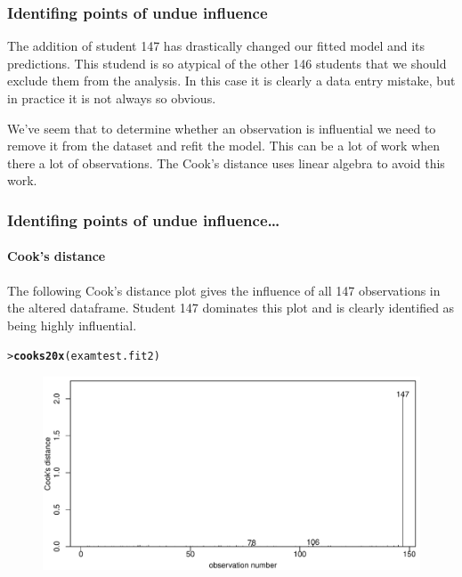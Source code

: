 \documentclass{beamer}\usepackage[]{graphicx}\usepackage[]{xcolor}
\makeatletter
\newcommand{\hlstd}[1]{\textcolor[rgb]{0.345,0.345,0.345}{#1}}%
\newcommand{\hlkwd}[1]{\textcolor[rgb]{0.737,0.353,0.396}{\textbf{#1}}}%
\newenvironment{kframe}{%
 \def\at@end@of@kframe{}%
 \ifinner\ifhmode%
  \def\at@end@of@kframe{\end{minipage}}%
  \begin{minipage}{\columnwidth}%
 \fi\fi%
 \def\FrameCommand##1{\hskip\@totalleftmargin \hskip-\fboxsep
 \colorbox{shadecolor}{##1}\hskip-\fboxsep
     \hskip-\linewidth \hskip-\@totalleftmargin \hskip\columnwidth}%
 \MakeFramed {\advance\hsize-\width
   \@totalleftmargin\z@ \linewidth\hsize
   \@setminipage}}%
 {\par\unskip\endMakeFramed%
 \at@end@of@kframe}
\newenvironment{knitrout}{}{} %
\makeatother
\begin{document}
\begin{frame}[fragile]
\frametitle{Identifing points of undue influence}

The addition of student 147 has drastically changed our fitted model and its predictions. This studend is so atypical of the other 146 students that we should exclude them from the analysis. In this case it is clearly a data entry mistake, but in practice it is not always so obvious.

\bigskip \bigskip
We've seem that to determine whether an observation is influential we need to remove it from the dataset and refit the model. This can be a lot of work when there a lot of observations. The Cook's distance uses linear algebra to avoid this work. 
\end{frame}


\begin{frame}[fragile]
\frametitle{Identifing points of undue influence\ldots}
\framesubtitle{Cook's distance}

The following Cook's distance plot gives the influence of all 147 observations in the altered dataframe. Student 147 dominates this plot and is clearly identified as being highly influential.

\begin{knitrout}\scriptsize
{}\color{fgcolor}\begin{kframe}
\begin{alltt}
\hlstd{> }\hlkwd{cooks20x}\hlstd{(examtest.fit2)}
\end{alltt}
\end{kframe}
\end{knitrout}



\begin{figure}
  \centering
  \includegraphics[scale=0.5]{figure/RC-H02-023}
\end{figure}

\end{frame}
\end{document}
